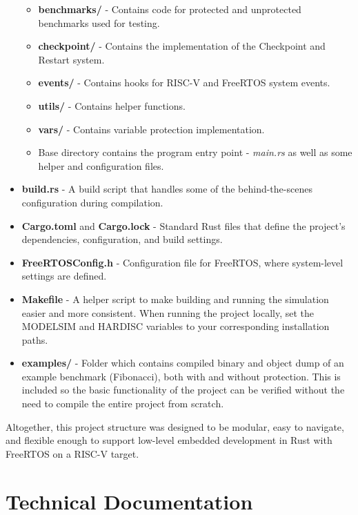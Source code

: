 \documentclass[12pt, letterpaper]{article}
\begin{document}
\begin{appendices}
\begin{itemize}
    \begin{itemize}
        \item \textbf{benchmarks/} - Contains code for protected and unprotected benchmarks used for testing.
        \item \textbf{checkpoint/} - Contains the implementation of the Checkpoint and Restart system.
        \item \textbf{events/} - Contains hooks for RISC-V and FreeRTOS system events.
        \item \textbf{utils/} - Contains helper functions.
        \item \textbf{vars/} - Contains variable protection implementation.
        \item Base directory contains the program entry point - \textit{main.rs} as well as some helper and configuration files.
    \end{itemize}
    
    \item \textbf{build.rs} - A build script that handles some of the behind-the-scenes configuration during compilation.
    
    \item \textbf{Cargo.toml} and \textbf{Cargo.lock} - Standard Rust files that define the project's dependencies, configuration, and build settings.
    
    \item \textbf{FreeRTOSConfig.h} - Configuration file for FreeRTOS, where system-level settings are defined.
    
    \item \textbf{Makefile} - A helper script to make building and running the simulation easier and more consistent.
    When running the project locally, set the MODELSIM and HARDISC variables to your corresponding installation paths.

    \item \textbf{examples/} - Folder which contains compiled binary and object dump of an example benchmark (Fibonacci), both with and without protection. This is included so the basic functionality of the project can be verified without the need to compile the entire project from scratch. 
\end{itemize}

Altogether, this project structure was designed to be modular, easy to navigate, and flexible enough to support low-level embedded development in Rust with FreeRTOS on a RISC-V target.


\clearpage
\section{Technical Documentation}


\end{appendices}
\end{document}
